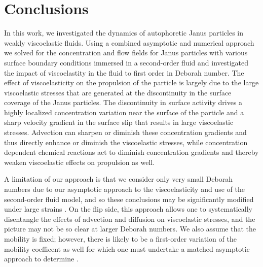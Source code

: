 \documentclass[aps,pre,reprint,twocolumn,notitlepage,superscriptaddress]{revtex4-1}
\begin{document}
\section{Conclusions}
In this work, we investigated the dynamics of autophoretic Janus particles in weakly viscoelastic fluids. Using a combined asymptotic and numerical approach we solved for the concentration and flow fields for Janus particles with various surface boundary conditions immersed in a second-order fluid and investigated the impact of viscoelastity in the fluid to first order in Deborah number. The effect of viscoelasticity on the propulsion of the particle is largely due to the large viscoelastic stresses that are generated at the discontinuity in the surface coverage of the Janus particles. The discontinuity in surface activity drives a highly localized concentration variation near the surface of the particle and a sharp velocity gradient in the surface slip that results in large viscoelastic stresses. Advection can sharpen or diminish these concentration gradients and thus directly enhance or diminish the viscoelastic stresses, while concentration dependent chemical reactions act to diminish concentration gradients and thereby weaken viscoelastic effects on propulsion as well.

A limitation of our approach is that we consider only very small Deborah numbers due to our asymptotic approach to the viscoelasticity and use of the second-order fluid model, and so these conclusions may be significantly modified under large strains \citep{zhu2012self, decorato15, datt2017active}. On the flip side, this approach allows one to systematically disentangle the effects of advection and diffusion on viscoelastic stresses, and the picture may not be so clear at larger Deborah numbers. We also assume that the mobility is fixed; however, there is likely to be a first-order variation of the mobility coefficent as well for which one must undertake a matched asymptotic approach to determine \citep{michelin14}.



\end{document}
